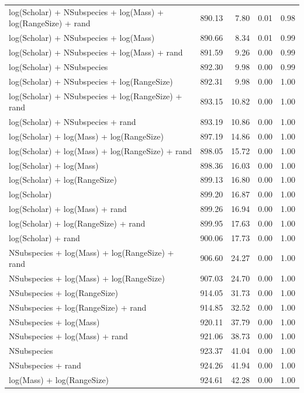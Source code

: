 \begin{landscape}
\begin{table}[ht]
\begin{tabular}{@{}lrrrr@{}}
  log(Scholar) + NSubspecies + log(Mass) + log(RangeSize) + rand & 890.13 & 7.80 & 0.01 & 0.98 \\ 
  log(Scholar) + NSubspecies + log(Mass) & 890.66 & 8.34 & 0.01 & 0.99 \\ 
  log(Scholar) + NSubspecies + log(Mass) + rand & 891.59 & 9.26 & 0.00 & 0.99 \\ 
  log(Scholar) + NSubspecies & 892.30 & 9.98 & 0.00 & 0.99 \\ 
  log(Scholar) + NSubspecies + log(RangeSize) & 892.31 & 9.98 & 0.00 & 1.00 \\ 
  log(Scholar) + NSubspecies + log(RangeSize) + rand & 893.15 & 10.82 & 0.00 & 1.00 \\ 
  log(Scholar) + NSubspecies + rand & 893.19 & 10.86 & 0.00 & 1.00 \\ 
  log(Scholar) + log(Mass) + log(RangeSize) & 897.19 & 14.86 & 0.00 & 1.00 \\ 
  log(Scholar) + log(Mass) + log(RangeSize) + rand & 898.05 & 15.72 & 0.00 & 1.00 \\ 
  log(Scholar) + log(Mass) & 898.36 & 16.03 & 0.00 & 1.00 \\ 
  log(Scholar) + log(RangeSize) & 899.13 & 16.80 & 0.00 & 1.00 \\ 
  log(Scholar) & 899.20 & 16.87 & 0.00 & 1.00 \\ 
  log(Scholar) + log(Mass) + rand & 899.26 & 16.94 & 0.00 & 1.00 \\ 
  log(Scholar) + log(RangeSize) + rand & 899.95 & 17.63 & 0.00 & 1.00 \\ 
  log(Scholar) + rand & 900.06 & 17.73 & 0.00 & 1.00 \\ 
  NSubspecies + log(Mass) + log(RangeSize) + rand & 906.60 & 24.27 & 0.00 & 1.00 \\ 
  NSubspecies + log(Mass) + log(RangeSize) & 907.03 & 24.70 & 0.00 & 1.00 \\ 
  NSubspecies + log(RangeSize) & 914.05 & 31.73 & 0.00 & 1.00 \\ 
  NSubspecies + log(RangeSize) + rand & 914.85 & 32.52 & 0.00 & 1.00 \\ 
  NSubspecies + log(Mass) & 920.11 & 37.79 & 0.00 & 1.00 \\ 
  NSubspecies + log(Mass) + rand & 921.06 & 38.73 & 0.00 & 1.00 \\ 
  NSubspecies & 923.37 & 41.04 & 0.00 & 1.00 \\ 
  NSubspecies + rand & 924.26 & 41.94 & 0.00 & 1.00 \\ 
  log(Mass) + log(RangeSize) & 924.61 & 42.28 & 0.00 & 1.00 \\ 

\end{tabular}
\end{table}
\end{landscape}
